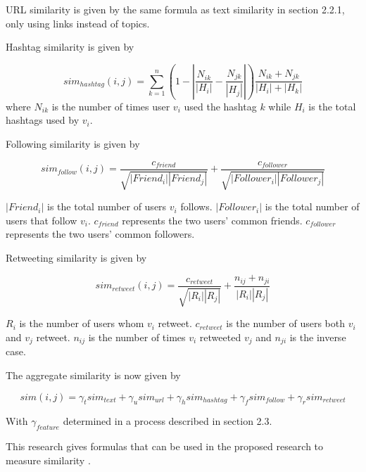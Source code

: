 URL similarity is given by the same formula as text similarity in section 2.2.1, only using links instead of topics.

Hashtag similarity is given by 

\begin{equation}
	sim_{hashtag}(i,j) = \sum_{k=1}^n (1 - \left|{\frac{N_{ik}}{\left|{H_i}\right|} - \frac{N_{jk}}{\left|{H_j}\right|}}\right|)\frac{N_{ik} + N_{jk}}{\left|{H_i}\right| + \left|{H_k}\right|}
\end{equation}where $N_{ik}$ is the number of times user $v_i$ used the hashtag $k$ while $H_i$ is the total hashtags used by $v_i$.

Following similarity is given by 

\begin{equation}
	sim_{follow}(i,j) = \frac{c_{friend}}{\sqrt{\left|{Friend_i}\right|\left|{Friend_j}\right|}} + \frac{c_{follower}}{\sqrt{\left|{Follower_i}\right|\left|{Follower_j}\right|}}
\end{equation}

$\left|{Friend_i}\right|$ is the total number of users $v_i$ follows. $\left|{Follower_i}\right|$ is the total number of users that follow $v_i$. $c_{friend}$ represents the two users’ common friends. $c_{follower}$ represents the two users’ common followers.

Retweeting similarity is given by 

\begin{equation}
	sim_{retweet}(i,j) = \frac{c_{retweet}}{\sqrt{\left|{R_i}\right|\left|{R_j}\right|}} + \frac{n_{ij} + n_{ji}}{\left|{R_i}\right|\left|{R_j}\right|}
\end{equation}

$R_i$ is the number of users whom $v_i$ retweet. $c_{retweet}$ is the number of users both $v_i$ and $v_j$ retweet. $n_{ij}$ is the number of times $v_i$ retweeted $v_j$ and $n_{ji}$ is the inverse case. 

The aggregate similarity is now given by

\begin{equation}
	sim(i,j) = \gamma_t sim_{text} + \gamma_u sim_{url} + \gamma_h sim_{hashtag} + \gamma_f sim_{follow} + \gamma_r sim_{retweet}
\end{equation}

With $\gamma_{feature}$ determined in a process described in section 2.3.

This research gives formulas that can be used in the proposed research to measure similarity \cite{Zhang:2012}. 

